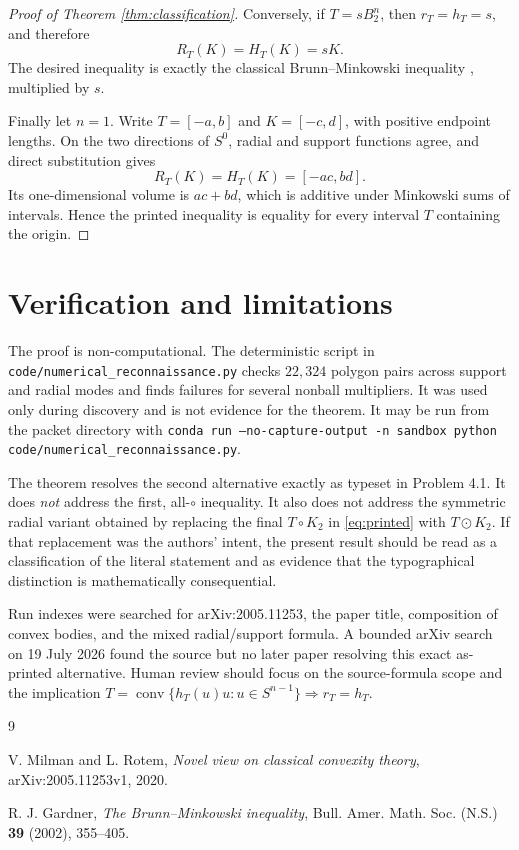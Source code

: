 \documentclass[11pt]{article}
\newcommand{\conv}{\operatorname{conv}}
\newcommand{\Sph}{S^{n-1}}
\begin{document}
\begin{proof}[Proof of Theorem \ref{thm:classification}]
Conversely, if $T=sB_2^n$, then $r_T=h_T=s$, and therefore
\[
 R_T(K)=H_T(K)=sK.
\]
The desired inequality is exactly the classical Brunn--Minkowski inequality
\cite{gardner}, multiplied by $s$.

Finally let $n=1$.  Write $T=[-a,b]$ and $K=[-c,d]$, with positive endpoint
lengths.  On the two directions of $S^0$, radial and support functions agree,
and direct substitution gives
\[
 R_T(K)=H_T(K)=[-ac,bd].
\]
Its one-dimensional volume is $ac+bd$, which is additive under Minkowski sums
of intervals.  Hence the printed inequality is equality for every interval
$T$ containing the origin.
\end{proof}

\section{Verification and limitations}

The proof is non-computational.  The deterministic script in
\texttt{code/numerical\_reconnaissance.py} checks $22{,}324$ polygon pairs
across support and radial modes and finds failures for several nonball
multipliers.  It was used only during discovery and is not evidence for the
theorem.  It may be run from the packet directory with
\texttt{conda run --no-capture-output -n sandbox python
code/numerical\_reconnaissance.py}.

The theorem resolves the second alternative exactly as typeset in Problem
4.1.  It does \emph{not} address the first, all-$\circ$ inequality.  It also
does not address the symmetric radial variant obtained by replacing the final
$T\circ K_2$ in \eqref{eq:printed} with $T\odot K_2$.  If that replacement was
the authors' intent, the present result should be read as a classification of
the literal statement and as evidence that the typographical distinction is
mathematically consequential.

Run indexes were searched for arXiv:2005.11253, the paper title, composition
of convex bodies, and the mixed radial/support formula.  A bounded arXiv search
on 19 July 2026 found the source but no later paper resolving this exact
as-printed alternative.  Human review should focus on the source-formula scope
and the implication
$T=\conv\{h_T(u)u:u\in\Sph\}\Rightarrow r_T=h_T$.

\begin{thebibliography}{9}

V. Milman and L. Rotem,
\emph{Novel view on classical convexity theory},
arXiv:2005.11253v1, 2020.

R. J. Gardner,
\emph{The Brunn--Minkowski inequality},
Bull. Amer. Math. Soc. (N.S.) \textbf{39} (2002), 355--405.

\end{thebibliography}
\end{document}
